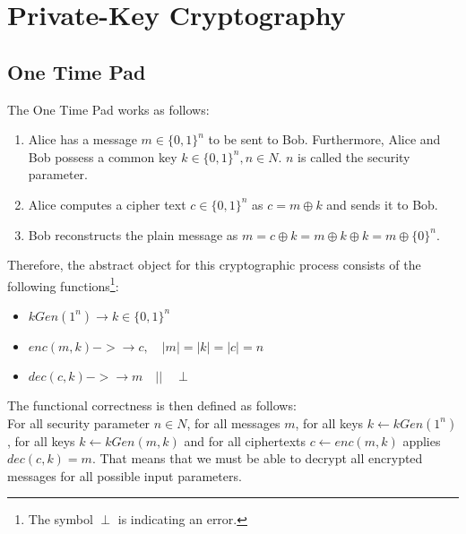 \chapter{Private-Key Cryptography}

\section{One Time Pad}

The One Time Pad works as follows:

\begin{enumerate}
    \item Alice has a message $m \in \{0,1\}^n$ to be sent to Bob. Furthermore, Alice and Bob possess a common key $k \in \{0,1\}^n, n\in N$. $n$ is called the security parameter.
    \item Alice computes a cipher text $c \in \{0,1\}^{n}$ as $c = m \oplus k$ and sends it to Bob.
    \item Bob reconstructs the plain message as $m = c \oplus k = m \oplus k \oplus k = m \oplus \{0\}^{n}$.
\end{enumerate}

Therefore, the abstract object for this cryptographic process consists of the following functions\footnote{The symbol $\perp$ is indicating an error.}:

\begin{itemize}
    \item $kGen(1^{n}) \rightarrow k \in \{0,1\}^{n}$
    \item $enc(m, k) -> \rightarrow c, \quad |m| = |k| = |c| = n$
    \item $dec(c, k) -> \rightarrow m \quad || \quad \perp$
\end{itemize}

The functional correctness is then defined as follows:\\
For all security parameter $n \in N$, for all messages $m$, for all keys $k \leftarrow kGen(1^{n})$, for all keys $k \leftarrow kGen(m,k)$ and for all ciphertexts $c \leftarrow enc(m,k)$ applies $dec(c,k) = m$. That means that we must be able to decrypt all encrypted messages for all possible input parameters.